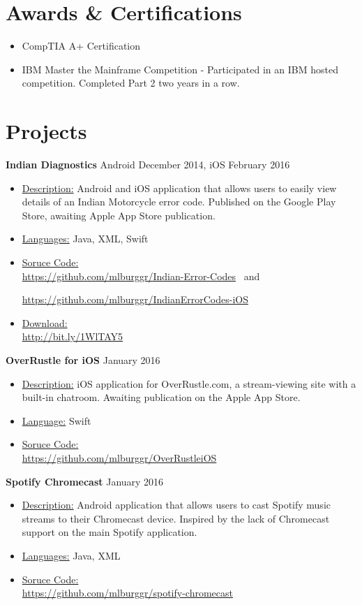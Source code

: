 \documentclass[margin]{res}
\begin{document}
\begin{resume}
 
\section{Awards \& Certifications}
\begin{itemize}
\item CompTIA A+ Certification
\item IBM Master the Mainframe Competition - Participated in an IBM hosted competition. Completed Part 2 two years in a row.
\end{itemize}

\section{Projects}
{\bf Indian Diagnostics} \hfill Android December 2014, iOS February 2016
\begin{itemize}   
 \item \underline{Description:} Android and iOS application that allows users to easily view details of an Indian Motorcycle error code. Published on the Google Play Store, awaiting Apple App Store publication.\
 \item \underline{Languages:} Java, XML, Swift\
 \item \underline{Soruce Code:} \\ \url{https://github.com/mlburggr/Indian-Error-Codes}      \ 
 and 

  \url{https://github.com/mlburggr/IndianErrorCodes-iOS}\
  
 \item \underline{Download:} \\ \url{http://bit.ly/1WlTAY5}
\end{itemize}

{\bf OverRustle for iOS} \hfill January 2016
\begin{itemize}
 \item \underline{Description:} iOS application for OverRustle.com, a stream-viewing site with a built-in chatroom. Awaiting publication on the Apple App Store.\
 \item \underline{Language:} Swift
 \item \underline{Soruce Code:} \\
 \url{https://github.com/mlburggr/OverRustleiOS}\
\end{itemize}

{\bf Spotify Chromecast} \hfill January 2016
\begin{itemize}
 \item \underline{Description:} Android application that allows users to cast Spotify music streams to their Chromecast device. Inspired by the lack of Chromecast support on the main Spotify application.\
 \item \underline{Languages:} Java, XML
 \item \underline{Soruce Code:} \\
 \url{https://github.com/mlburggr/spotify-chromecast}\
\end{itemize}


\end{resume}
\end{document}

